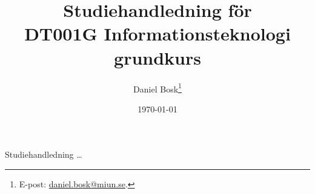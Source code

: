 \documentclass[a4paper,11pt,logo]{miunart}
\title{Studiehandledning för\\DT001G Informationsteknologi grundkurs}
\author{Daniel Bosk\footnote{%
	E-post: \href{mailto:daniel.bosk@miun.se}{daniel.bosk@miun.se}.
}}
\date{\today}
\begin{document}
\maketitle
\noindent
Studiehandledning \dots



\end{document}
